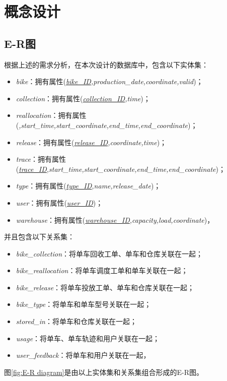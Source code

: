 \section{概念设计}\label{sec:concept}
\subsection{E-R图}
根据上述的需求分析，在本次设计的数据库中，包含以下实体集：
\begin{itemize}
  \item \textit{bike}：拥有属性(\textit{\underline{bike\_ID},production\_date,coordinate,valid})；
  \item \textit{collection}：拥有属性(\textit{\underline{collection\_ID},time})；
  \item \textit{reallocation}：拥有属性(\textit{,start\_time,start\_coordinate,end\_time,end\_coordinate})；
  \item \textit{release}：拥有属性(\textit{\underline{release\_ID},coordinate,time})；
  \item \textit{trace}：拥有属性(\textit{\underline{trace\_ID},start\_time,start\_coordinate,end\_time,end\_coordinate})；
  \item \textit{type}：拥有属性(\textit{\underline{type\_ID},name,release\_date})；
  \item \textit{user}：拥有属性(\textit{\underline{user\_ID}})；
  \item \textit{warehouse}：拥有属性(\textit{\underline{warehouse\_ID},capacity,load,coordinate})，
\end{itemize}
并且包含以下关系集：
\begin{itemize}
  \item \textit{bike\_collection}：将单车回收工单、单车和仓库关联在一起；
  \item \textit{bike\_reallocation}：将单车调度工单和单车关联在一起；
  \item \textit{bike\_release}：将单车投放工单、单车和仓库关联在一起；
  \item \textit{bike\_type}：将单车和单车型号关联在一起；
  \item \textit{stored\_in}：将单车和仓库关联在一起；
  \item \textit{usage}：将单车、单车轨迹和用户关联在一起；
  \item \textit{user\_feedback}：将单车和用户关联在一起，
\end{itemize}

图\ref{fig:E-R diagram}是由以上实体集和关系集组合形成的E-R图。

